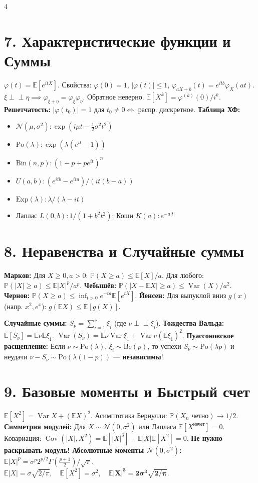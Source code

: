 \documentclass[8pt, a4paper, landscape]{extarticle}
\newcommand{\E}{\mathbb{E}}
\renewcommand{\P}{\mathbb{P}}
\DeclareMathOperator{\Var}{Var}
\DeclareMathOperator{\Cov}{Cov}
\newcommand{\N}{\mathcal{N}}
\begin{document}
\begin{multicols*}{4}
\section*{7. Характеристические функции и Суммы}
$\varphi(t) = \E[e^{itX}]$. Свойства: $\varphi(0)\!=\!1$, $|\varphi(t)| \!\le\! 1$, $\varphi_{aX+b}(t) \!=\! e^{itb}\varphi_X(at)$.
$\xi \perp\!\!\perp \eta \implies \varphi_{\xi+\eta} = \varphi_\xi \varphi_\eta$. Обратное неверно. $\E[X^k] = \varphi^{(k)}(0) / i^k$.
\textbf{Решетчатость:} $|\varphi(t_0)|=1$ для $t_0 \ne 0 \iff$ распр. дискретное.
\textbf{Таблица ХФ:}
\begin{itemize}
    \item $\N(\mu,\sigma^2): \exp(i\mu t - \frac{1}{2}\sigma^2 t^2)$
    \item $\text{Po}(\lambda): \exp(\lambda(e^{it}-1))$
    \item $\text{Bin}(n,p): (1-p+pe^{it})^n$
    \item $U(a,b): (e^{itb}-e^{ita}) / (it(b-a))$
    \item $\text{Exp}(\lambda): \lambda / (\lambda-it)$
    \item Лаплас $L(0,b): 1 / (1+b^2 t^2)$; Коши $K(a): e^{-a|t|}$
\end{itemize}

\section*{8. Неравенства и Случайные суммы}
\textbf{Марков:} Для $X \ge 0, a>0$: $\P(X \ge a) \le \E[X]/a$. Для любого: $\P(|X| \ge a) \le \E|X|^p/a^p$.
\textbf{Чебышёв:} $\P(|X-\E X| \ge a) \le \Var(X)/a^2$.
\textbf{Чернов:} $\P(X \ge a) \le \inf_{t>0} e^{-ta}\E[e^{tX}]$.
\textbf{Йенсен:} Для выпуклой вниз $g(x)$ (напр. $x^2, e^x$): $g(\E X) \le \E[g(X)]$.

\textbf{Случайные суммы:} $S_\nu = \sum_{i=1}^\nu \xi_i$ (где $\nu \perp\!\!\perp \xi_i$).
\textbf{Тождества Вальда:} $\E[S_\nu] \!=\! \E\nu\E\xi_1$. $\Var(S_\nu) \!=\! \E\nu\Var\xi_1 \!+\! \Var\nu(\E\xi_1)^2$.
\textbf{Пуассоновское расщепление:} Если $\nu \sim \text{Po}(\lambda)$, $\xi_i \sim \text{Be}(p)$, то успехи $S_\nu \sim \text{Po}(\lambda p)$ и неудачи $\nu-S_\nu \sim \text{Po}(\lambda(1-p))$ --- \textbf{независимы}!

\section*{9. Базовые моменты и Быстрый счет}
$\E[X^2] = \Var X + (\E X)^2$. Асимптотика Бернулли: $\P(X_n \text{ четно}) \to 1/2$.
\textbf{Симметрия модулей:} Для $X \sim \N(0, \sigma^2)$ или Лапласа $\E[X^{\text{нечет}}]=0$. Ковариация: $\Cov(|X|, X^2) = \E[|X|^3] - \E|X|\E[X^2] = 0$. \textbf{Не нужно раскрывать модуль!}
\textbf{Абсолютные моменты $\N(0, \sigma^2)$:} $\E|X|^p \!=\! \sigma^p 2^{p/2} \Gamma(\frac{p+1}{2})/\sqrt{\pi}$.
$\E|X| = \sigma \sqrt{2/\pi}, \quad \E[X^2]=\sigma^2, \quad \mathbf{\E|X|^3 = 2\sigma^3 \sqrt{2/\pi}}$.


\end{multicols*}
\end{document}

